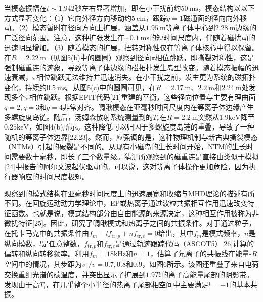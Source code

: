 \documentclass[oneside,onecolumn]{article}
\begin{document}
\begin{sloppypar}
  
 当模态振幅在$t \sim 1.942$秒左右显著增加，即在小干扰前约$50 \mathrm{~ms}$，模态结构以以下方式显著变化：（1）它向外径方向移动约$5 \mathrm{~cm}$，跟踪$q=1$磁通面的径向向外移动。（2）模态暂时在径向方向上扩展，涵盖从$1.95 \mathrm{~m}$等离子体中心到$2.28 \mathrm{~m}$边缘的广泛径向范围。注意，这种扩张发生在$\sim 0.1 \mathrm{~ms}$的短时间尺度内，伴随着磁扰动的迅速明显增加。（3）随着模态的扩展，扭转对称性仅在等离子体核心中得以保留。在$R=2.22 \mathrm{~m}$（见图5(b)中的圆圈）观察到径向$\pi$相位跳跃，即撕裂对称性，这是强制磁重连的迹象，导致等离子体边缘的磁拓扑发生岛型改变。随着模态振幅的迅速衰减，$\pi$相位跳跃无法维持并迅速消失。在小干扰之前，发生更为系统的磁拓扑变化，持续约$0.5 \mathrm{~ms}$。从图5(c)中的圆圈可见，在$R=2.17 \mathrm{~m}$、$2.2 \mathrm{~m}$和$2.24 \mathrm{~m}$处发现多个$\pi$相位跳跃。根据EFIT代码[21]重建的平衡，这些径向位置与主要有理曲面$q=2, q=3$和$q=4$非常对齐。啁啾模态在亚毫秒时间尺度内在等离子体边缘产生多螺旋度岛链。随后，汤姆森散射系统测量到的$T_{e}$在$R=2.2 \mathrm{~m}$突然从$1.9 \mathrm {keV}$降至$0.25 \mathrm{keV}$，如图4(b)所示。这种降低可以归因于多螺旋度岛链的重叠，导致了一种随机的等离子体边界[22,23]。然而，应强调的是，这种物理机制与新古典撕裂模态（NTMs）引起的破裂是不同的。从现有小磁岛的生长时间开始，NTM的生长时间需要数十毫秒，即长了三个数量级。猜测所观察到的磁重连是直接由类似于模拟[24]中报告的阿尔文波起伏驱动的。可以说，这对等离子体操作更加危险，因为执行器响应的时间尺度极短。
  
 观察到的模式结构在亚毫秒时间尺度上的迅速展宽和收缩与MHD理论的描述有所不同。在回旋运动动力学理论中，EP或热离子通过波粒共振相互作用迅速改变特征函数。也就是说，模式结构部分由自由能源的来源决定，这种相互作用被称为非微扰特征[25]。因此，研究了啁啾模式和热离子之间的共振条件。对于通过粒子，在托卡马克中的共振条件由$f_{m}-l f_{\mathrm{tr}, p}+n f_{\mathrm{tr}, t}=0$给出，其中$f_{m}$是模式频率，$n$是纵向模数，$l$是任意整数，$f_{\mathrm{tr}, p}$和$f_{\mathrm{tr}, t}$是通过轨迹跟踪代码（ASCOT5）[26]计算的偏转和纵向转移频率。利用$f_{m} =18\mathrm{kHz}$和$n=1$，估算了氘离子的共振线在能量-$R$空间中的情况，其步距为$v_{\|}/v=0.7,0.8$和$0.9$，如图6所示。该图还重叠了来自电荷交换重组光谱的碳温度，并突出显示了扩展到$1.9 Ti$的离子高能量尾部的阴影带。发现由于高$T_{i}$，在几乎整个小半径的热离子尾部相空间中主要满足$l=-1$的基本共振。
  

\end{sloppypar}
\end{document}
